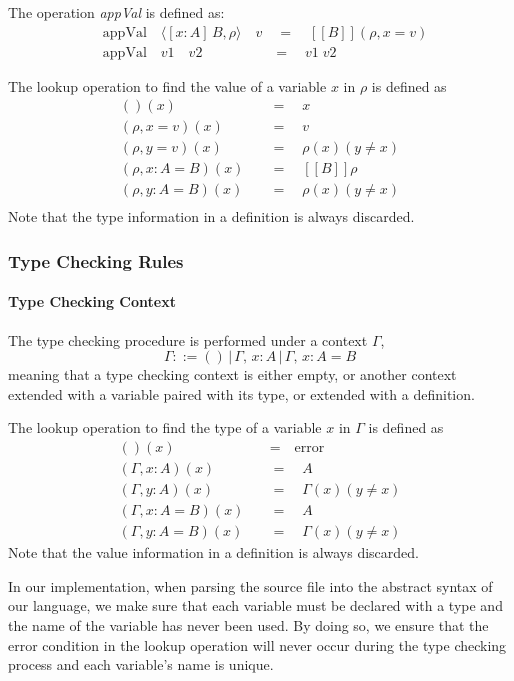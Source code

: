 \documentclass{article}
\theoremstyle{remark}
\begin{document}
The operation \emph{appVal} is defined as:
\begin{align*}
  &\text{appVal} \quad \langle [x : A]\,B, \rho \rangle \quad v \quad = \quad [\![B]\!](\rho, x = v) \\
  &\text{appVal} \quad v1 \quad v2 \quad \quad \quad \quad \quad = \quad v1\;v2
\end{align*}

The lookup operation to find the value of a variable $x$ in $\rho$ is defined as
\begin{align*}
  ()(x) \quad &= \quad x \\
  (\rho, x = v)(x) \quad &= \quad v \\
  (\rho, y = v)(x) \quad &= \quad \rho(x)(y \neq x) \\
  (\rho, x : A = B)(x) \quad &= \quad [\![B]\!]\rho \\
  (\rho, y : A = B)(x) \quad &= \quad \rho(x)(y \neq x) \\
\end{align*}
Note that the type information in a definition is always discarded.

\subsubsection{Type Checking Rules}
\paragraph{Type Checking Context}
The type checking procedure is performed under a context $\Gamma$,
\[
  \Gamma ::= ()\,|\,\Gamma,\,x : A\,|\,\Gamma,\,x : A = B
\]
meaning that a type checking context is either empty, or another context extended with a variable paired with its type, or extended with a definition.

The lookup operation to find the type of a variable $x$ in $\Gamma$ is defined as
\begin{align*}
  ()(x) \quad &= \quad \text{error} \\
  (\Gamma, x : A)(x) \quad &= \quad A \\
  (\Gamma, y : A)(x) \quad &= \quad \Gamma(x)(y \neq x) \\
  (\Gamma, x : A = B)(x) \quad &= \quad A \\
  (\Gamma, y : A = B)(x) \quad &= \quad \Gamma(x)(y \neq x) 
\end{align*}
Note that the value information in a definition is always discarded.

In our implementation, when parsing the source file into the abstract syntax of our language, we make sure that each variable must be declared with a type and the name of the variable has never been used. By doing so, we ensure that the error condition in the lookup operation will never occur during the type checking process and each variable's name is unique.
\end{document}
